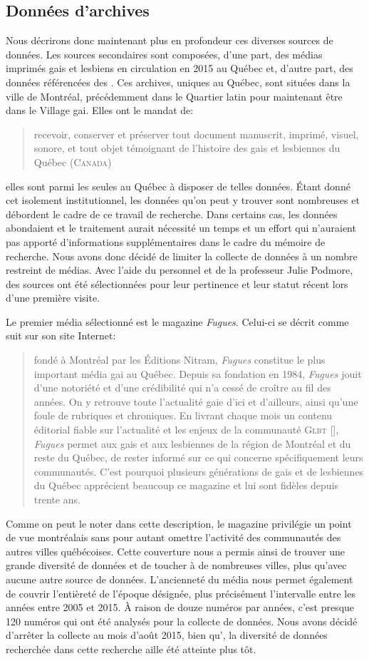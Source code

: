 \subsection{Données d'archives}
\label{sub:donn_es_d_archives}

Nous décrirons donc maintenant plus en profondeur ces diverses sources de données.
Les sources secondaires sont composées, d'une part, des médias imprimés gais et lesbiens en circulation en 2015 au Québec et, d'autre part, des données référencées des \agq{}.
Ces archives, uniques au Québec, sont situées dans la ville de Montréal, précédemment dans le Quartier latin pour maintenant être dans le Village gai.
Elles ont le mandat de: \blockquote[{\cite{LAGQ2014}}][.]{\textelp{} recevoir, conserver et préserver tout document manuscrit, imprimé, visuel, sonore, et tout objet témoignant de l'histoire des gais et lesbiennes du Québec (\textsc{Canada})}; elles sont parmi les seules au Québec à disposer de telles données.
Étant donné cet isolement institutionnel, les données qu'on peut y trouver sont nombreuses et débordent le cadre de ce travail de recherche.
Dans certains cas, les données abondaient et le traitement aurait nécessité un temps et un effort qui n'auraient pas apporté d'informations supplémentaires dans le cadre du mémoire de recherche.
Nous avons donc décidé de limiter la collecte de données à un nombre restreint de médias.
Avec l'aide du personnel et de la professeur Julie Podmore, des sources ont été sélectionnées pour leur pertinence et leur statut récent lors d'une première visite.

Le premier média sélectionné est le magazine \emph{Fugues}.
Celui-ci se décrit comme suit sur son site Internet: \blockquote[{\cite{LesNitram2015}}][.]{fondé à Montréal par les Éditions Nitram, \emph{Fugues} constitue le plus important média gai au Québec.
 Depuis sa fondation en 1984, \emph{Fugues} jouit d’une notoriété et d’une crédibilité qui n’a cessé de croître au fil des années.
 On y retrouve toute l’actualité gaie d’ici et d’ailleurs, ainsi qu'une foule de rubriques et chroniques.
 En livrant chaque mois un contenu éditorial fiable sur l’actualité et les enjeux de la communauté \textsc{Glbt} [], \emph{Fugues} permet aux gais et aux lesbiennes de la région de Montréal et du reste du Québec, de rester informé sur ce qui concerne spécifiquement leurs communautés.
C’est pourquoi plusieurs générations de gais et de lesbiennes du Québec apprécient beaucoup ce magazine et lui sont fidèles depuis trente ans.}
Comme on peut le noter dans cette description, le magazine privilégie un point de vue montréalais sans pour autant omettre l'activité des communautés \lgbt{} des autres villes québécoises.
Cette couverture nous a permis ainsi de trouver une grande diversité de données et de toucher à de nombreuses villes, plus qu'avec aucune autre source de données.
L'ancienneté du média nous permet également de couvrir l'entièreté de l'époque désignée, plus précisément l'intervalle entre les années entre 2005 et 2015.
À raison de douze numéros par années, c'est presque 120 numéros qui ont été analysés pour la collecte de données.
Nous avons décidé d'arrêter la collecte au mois d'août 2015, bien qu', la diversité de données recherchée dans cette recherche aille été atteinte plus tôt.

